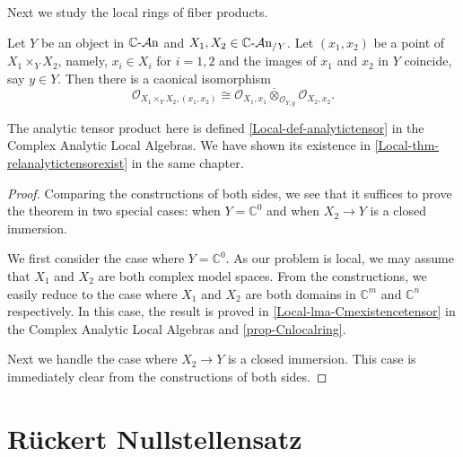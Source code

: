 Next we study the local rings of fiber products.
\begin{theorem}
    Let $Y$ be an object in $\mathbb{C}\text{-}\mathcal{A}\mathrm{n}$ and $X_1,X_2\in \mathbb{C}\text{-}\mathcal{A}\mathrm{n}_{/Y}$. Let $(x_1,x_2)$ be a point of $X_1\times_Y X_2$, namely, $x_i\in X_i$ for $i=1,2$ and the images of $x_1$ and $x_2$ in $Y$ coincide, say $y\in Y$. 
    Then there is a caonical isomorphism
    \[
        \mathcal{O}_{X_1\times_Y X_2, (x_1,x_2)}\cong \mathcal{O}_{X_1,x_1}\overline{\otimes}_{\mathcal{O}_{Y,y}}  \mathcal{O}_{X_2,x_2}.     
    \]
\end{theorem}
The analytic tensor product here is defined \cref{Local-def-analytictensor} in the Complex Analytic Local Algebras. We have shown its existence in \cref{Local-thm-relanalytictensorexist} in the same chapter.

\begin{proof}
    Comparing the constructions of both sides, we see that it suffices to prove the theorem in two special cases: when $Y=\mathbb{C}^0$ and when $X_2\rightarrow Y$ is a closed immersion. 

    We first consider the case where $Y=\mathbb{C}^0$. As our problem is local, we may assume that $X_1$ and $X_2$ are both complex model spaces. From the constructions, we easily reduce to the case where $X_1$ and $X_2$ are both domains in $\mathbb{C}^m$ and $\mathbb{C}^n$ respectively. In this case, the result is proved in \cref{Local-lma-Cmexistencetensor} in the Complex Analytic Local Algebras and \cref{prop-Cnlocalring}.
    
    Next we handle the case where $X_2\rightarrow Y$ is a closed immersion. This case is immediately clear from the constructions of both sides.
\end{proof}



\iffalse
\section{Rückert Nullstellensatz}




